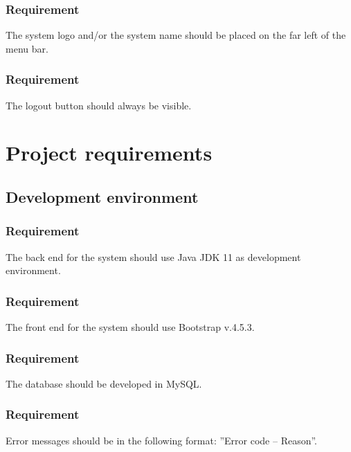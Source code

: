 \documentclass{article}
\begin{document}
\subsubsection{Requirement}
The system logo and/or the system name should be placed on the far left
of the menu bar.

\subsubsection{Requirement}
The logout button should always be visible.

\section{Project requirements}
\subsection{Development environment}

\subsubsection{Requirement}
The back end for the system should use Java JDK 11 as development environment.

\subsubsection{Requirement}
The front end for the system should use Bootstrap v.4.5.3.

\subsubsection{Requirement}
The database should be developed in MySQL.

\subsubsection{Requirement}
Error messages should be in the following format: ”Error code – Reason”.
\end{document}
